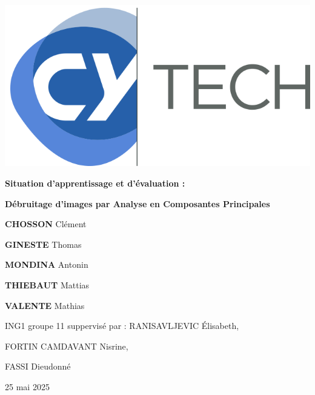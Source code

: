 \begin{titlepage}
    \begin{center}
        \includegraphics[width=0.5\linewidth]{reference/picture/CYTECHlogo.png}\par\vspace{1cm}
        \vspace{1cm}
        {\huge \bfseries Situation d'apprentissage et d'évaluation : \par}
        {\huge \bfseries Débruitage d'images par Analyse en Composantes Principales \par}
    \end{center}
    \vspace{1.5cm}
    {\Large \textbf{CHOSSON} Clément\par}
    {\Large \textbf{GINESTE} Thomas \par}
    {\Large \textbf{MONDINA} Antonin \par}
    {\Large \textbf{THIEBAUT} Mattias \par}
    {\Large \textbf{VALENTE} Mathias \par}
    \vspace{0.5cm}
    {\large ING1 groupe 11}
    \vfill
    suppervisé par : RANISAVLJEVIC Élisabeth, \par
    \hspace{2.74cm}    
    FORTIN CAMDAVANT Nisrine, \par
    \hspace{2.74cm}    
    FASSI Dieudonné
    \vfill
    \begin{center}
        25 mai 2025
    \end{center}
\end{titlepage}

\tableofcontents
